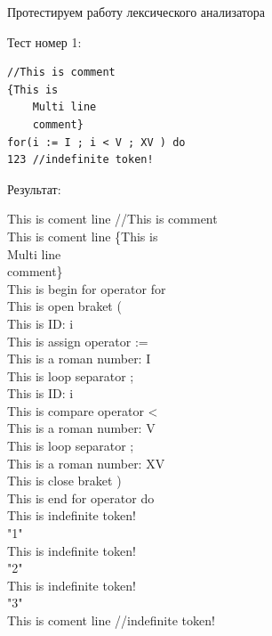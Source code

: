 \documentclass[12pt]{report}
\begin{document}
Протестируем работу лексического анализатора\\
\hline 
\begin{center}
Тест номер 1:
\end{center}
\begin{verbatim}
//This is comment
{This is 
	Multi line
	comment}
for(i := I ; i < V ; XV ) do
123 //indefinite token!
\end{verbatim}
\text{}\newline
\begin{center}
    Результат:\\
\end{center}
This is coment line             //This is comment\\
This is coment line             \{This is\\
        Multi line\\
        comment\}\\
This is begin for operator      for\\
This is open braket             (\\
This is ID:                 i\\
This is assign operator :=\\
This is a roman number: I\\
This is loop separator          ;\\
This is ID:                 i\\
This is compare operator        <\\
This is a roman number: V\\
This is loop separator          ;\\
This is a roman number: XV\\
This is close braket            )\\
This is end for operator        do\\
This is indefinite token!\\
        "1"\\
This is indefinite token!\\
        "2"\\
This is indefinite token!\\
        "3"\\
This is coment line             //indefinite token!\\

\hline 
\end{document}
